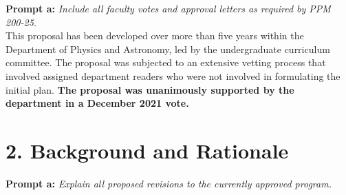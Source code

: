 \documentclass[12pt]{article}
\begin{document}
\noindent
{\bf Prompt a:} {\it Include all faculty votes and approval letters as required by PPM 200-25.}\\[4pt]

\noindent
This proposal has been developed over more than five years within the
Department of Physics and Astronomy, led by the undergraduate
curriculum committee.  The proposal was subjected to an extensive
vetting process that involved assigned department readers who were not
involved in formulating the initial plan.  {\bf The proposal was
unanimously supported by the department in a December 2021 vote.}

\section*{2. Background and Rationale}

\noindent
{\bf Prompt a:} {\it Explain all proposed revisions to the currently approved program.}\\[4pt]
\end{document}
